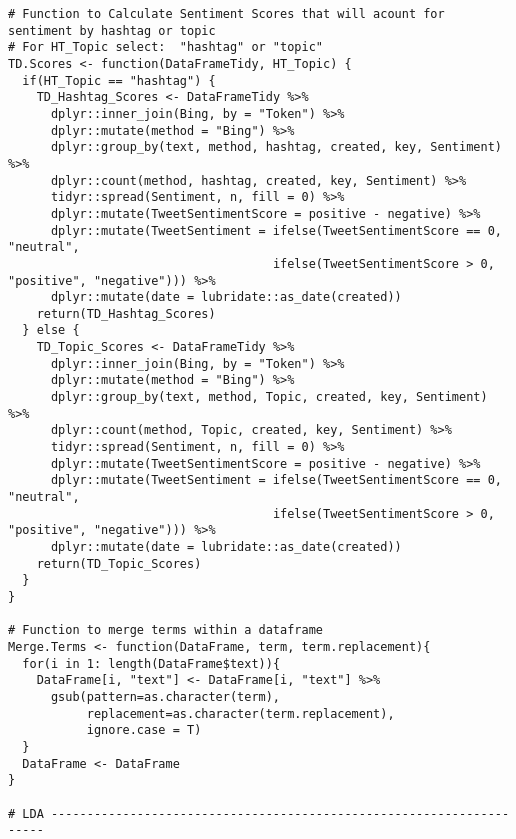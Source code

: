 \begin{lstlisting}
# Function to Calculate Sentiment Scores that will acount for sentiment by hashtag or topic
# For HT_Topic select:  "hashtag" or "topic"
TD.Scores <- function(DataFrameTidy, HT_Topic) {
  if(HT_Topic == "hashtag") {
    TD_Hashtag_Scores <- DataFrameTidy %>% 
      dplyr::inner_join(Bing, by = "Token") %>% 
      dplyr::mutate(method = "Bing") %>% 
      dplyr::group_by(text, method, hashtag, created, key, Sentiment) %>% 
      dplyr::count(method, hashtag, created, key, Sentiment) %>%  
      tidyr::spread(Sentiment, n, fill = 0) %>% 
      dplyr::mutate(TweetSentimentScore = positive - negative) %>% 
      dplyr::mutate(TweetSentiment = ifelse(TweetSentimentScore == 0, "neutral",
                                     ifelse(TweetSentimentScore > 0, "positive", "negative"))) %>% 
      dplyr::mutate(date = lubridate::as_date(created))
    return(TD_Hashtag_Scores)
  } else {
    TD_Topic_Scores <- DataFrameTidy %>% 
      dplyr::inner_join(Bing, by = "Token") %>% 
      dplyr::mutate(method = "Bing") %>% 
      dplyr::group_by(text, method, Topic, created, key, Sentiment) %>% 
      dplyr::count(method, Topic, created, key, Sentiment) %>%  
      tidyr::spread(Sentiment, n, fill = 0) %>% 
      dplyr::mutate(TweetSentimentScore = positive - negative) %>% 
      dplyr::mutate(TweetSentiment = ifelse(TweetSentimentScore == 0, "neutral",
                                     ifelse(TweetSentimentScore > 0, "positive", "negative"))) %>% 
      dplyr::mutate(date = lubridate::as_date(created))
    return(TD_Topic_Scores)
  }
}

# Function to merge terms within a dataframe
Merge.Terms <- function(DataFrame, term, term.replacement){
  for(i in 1: length(DataFrame$text)){
    DataFrame[i, "text"] <- DataFrame[i, "text"] %>% 
      gsub(pattern=as.character(term),
           replacement=as.character(term.replacement),
           ignore.case = T)   
  }
  DataFrame <- DataFrame
}

# LDA ---------------------------------------------------------------------


\end{lstlisting}

